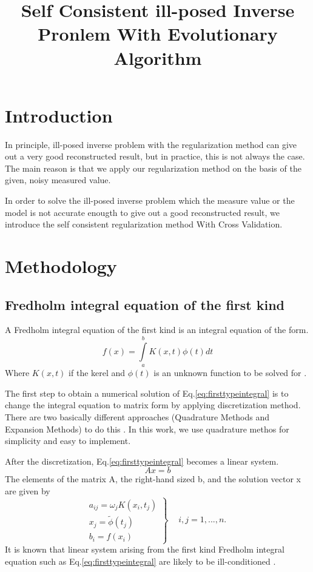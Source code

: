 \documentclass{article}
\begin{document}
\title{Self Consistent ill-posed Inverse Pronlem With Evolutionary Algorithm}
\maketitle

\section{Introduction}
In principle, ill-posed inverse problem with the regularization method can give
out a very good reconstructed result, but in practice, this is not always the
case. The main reason is that we apply our regularization method on the basis of
the given, noisy measured value.

In order to solve the ill-posed inverse problem
which the measure value or the model is not accurate enougth to give out a good reconstructed result, we
introduce the self consistent regularization method With Cross Validation.
\section{Methodology}
\subsection{Fredholm integral equation of the first kind}
A Fredholm integral equation of the first kind is an integral equation of the
form.
\begin{equation}
f(x) = \int\limits_a^b {K(x,t)\phi (t)dt}
\label{eq:firsttypeintegral}
\end{equation}
Where \(K(x,t)\) if the kerel and \(\phi (t)\) is an unknown function to be
solved for \cite{arfken2013mathematical}.

The first step to obtain a numerical solution of Eq.\ref{eq:firsttypeintegral}
is to change the integral equation to matrix form by applying discretization
method. There are two basically different approaches (Quadrature Methods and
Expansion Methods) to do this \cite{hackbusch2012integral}. In this work, we use
quadrature methos for simplicity and easy to implement.

After the discretization, Eq.\ref{eq:firsttypeintegral} becomes a linear system.
\begin{equation}
Ax = b
\label{eq:discreteintegral}
\end{equation}
The elements of the matrix A, the right-hand sized b, and the solution vector x
are given by
\begin{equation}
\left. {\begin{array}{*{20}{c}}
{{a_{ij}} = {\omega _j}K({x_i},{t_j})}\\
{{x_j} = \tilde \phi ({t_j})}\\
{{b_i} = f({x_i})}
\end{array}} \right\}\begin{array}{*{20}{c}}
{}&{i,j = 1,...,n.}
\end{array}
\end{equation}
It is known that linear system arising from the first kind Fredholm integral
equation such as Eq.\ref{eq:firsttypeintegral} are likely to be ill-conditioned
\cite{neumaier1998solving}.
\end{document}
